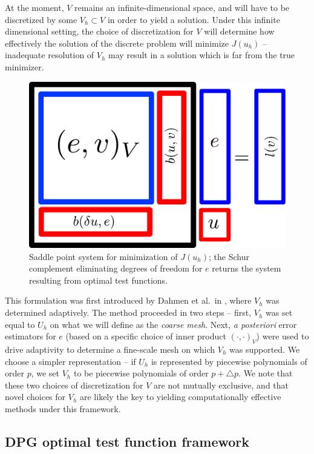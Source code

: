 \documentclass[final,leqno]{siamltex}
\newcommand{\LRp}[1]{\left( #1 \right)}
\begin{document}
At the moment, $V$ remains an infinite-dimensional space, and will have to be discretized by some $V_h\subset V$ in order to yield a solution.  Under this infinite dimensional setting, the choice of discretization for $V$ will determine how effectively the solution of the discrete problem will minimize $J(u_h)$ -- inadequate resolution of $V_h$ may result in a solution which is far from the true minimizer.  

\begin{figure}[!h]
\centering
\includegraphics[scale=.3]{figs/saddlePoint.pdf}
\caption{Saddle point system for minimization of $J(u_h)$; the Schur complement eliminating degrees of freedom for $e$ returns the system resulting from optimal test functions.}
\end{figure}

This formulation was first introduced by Dahmen et al.\ in \cite{DahmenVariationalStabilization}, where $V_h$ was determined adaptively.  The method proceeded in two steps -- first, $V_h$ was set equal to $U_h$ on what we will define as the \textit{coarse mesh}.  Next, \textit{a posteriori} error estimators for $e$ (based on a specific choice of inner product $\LRp{\cdot,\cdot}_V$) were used to drive adaptivity to determine a fine-scale mesh on which $V_h$ was supported.  We choose a simpler representation -- if $U_h$ is represented by piecewise polynomials of order $p$, we set $V_h$ to be piecewise polynomials of order $p+\triangle p$.  We note that these two choices of discretization for $V$ are not mutually exclusive, and that novel choices for $V_h$ are likely the key to yielding computationally effective methods under this framework.  
\subsection{DPG optimal test function framework}
\end{document}
